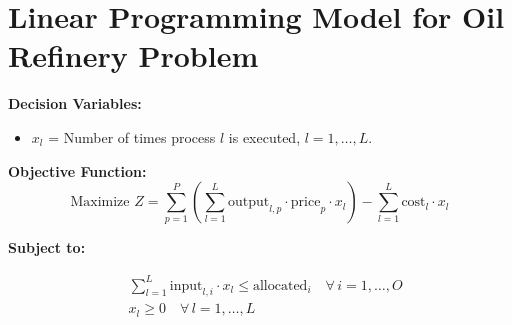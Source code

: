 \documentclass{article}
\begin{document}
\section*{Linear Programming Model for Oil Refinery Problem}

\noindent \textbf{Decision Variables:}
\begin{itemize}
    \item \( x_l \) = Number of times process \( l \) is executed, \( l = 1, \ldots, L \).
\end{itemize}

\noindent \textbf{Objective Function:}
\[
\text{Maximize } Z = \sum_{p=1}^{P} \left( \sum_{l=1}^{L} \text{output}_{l,p} \cdot \text{price}_p \cdot x_l \right) - \sum_{l=1}^{L} \text{cost}_l \cdot x_l 
\]

\noindent \textbf{Subject to:}

\begin{align*}
    & \sum_{l=1}^{L} \text{input}_{l,i} \cdot x_l \leq \text{allocated}_i \quad \forall \, i = 1, \ldots, O \\
    & x_l \geq 0 \quad \forall \, l = 1, \ldots, L
\end{align*}
\end{document}
